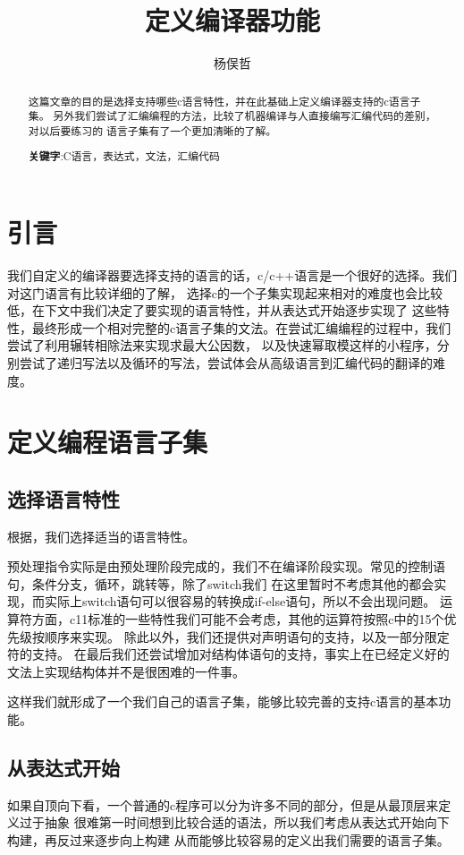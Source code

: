 \documentclass[UTF8]{ctexart}
\begin{document}
\title{定义编译器功能}
\author{杨俣哲}
\maketitle
\begin{abstract}
	这篇文章的目的是选择支持哪些c语言特性，并在此基础上定义编译器支持的c语言子集。
	另外我们尝试了汇编编程的方法，比较了机器编译与人直接编写汇编代码的差别，对以后要练习的
	语言子集有了一个更加清晰的了解。

    \centering
    \textbf{关键字}:C语言，表达式，文法，汇编代码
\end{abstract}
\newpage
\tableofcontents
\newpage
\section{引言}
我们自定义的编译器要选择支持的语言的话，c/c++语言是一个很好的选择。我们对这门语言有比较详细的了解，
选择c的一个子集实现起来相对的难度也会比较低，在下文中我们决定了要实现的语言特性，并从表达式开始逐步实现了
这些特性，最终形成一个相对完整的c语言子集的文法。在尝试汇编编程的过程中，我们尝试了利用辗转相除法来实现求最大公因数，
以及快速幂取模这样的小程序，分别尝试了递归写法以及循环的写法，尝试体会从高级语言到汇编代码的翻译的难度。
\section{定义编程语言子集}
\subsection{选择语言特性}
根据\cite{creference}，我们选择适当的语言特性。

预处理指令实际是由预处理阶段完成的，我们不在编译阶段实现。常见的控制语句，条件分支，循环，跳转等，除了switch我们
在这里暂时不考虑其他的都会实现，而实际上switch语句可以很容易的转换成if-else语句，所以不会出现问题。
运算符方面，c11标准的一些特性我们可能不会考虑，其他的运算符按照c中的15个优先级按顺序来实现。
除此以外，我们还提供对声明语句的支持，以及一部分限定符的支持。
在最后我们还尝试增加对结构体语句的支持，事实上在已经定义好的文法上实现结构体并不是很困难的一件事。

这样我们就形成了一个我们自己的语言子集，能够比较完善的支持c语言的基本功能。
\subsection{从表达式开始}
如果自顶向下看，一个普通的c程序可以分为许多不同的部分，但是从最顶层来定义过于抽象
很难第一时间想到比较合适的语法，所以我们考虑从表达式开始向下构建，再反过来逐步向上构建
从而能够比较容易的定义出我们需要的语言子集。
\end{document}
